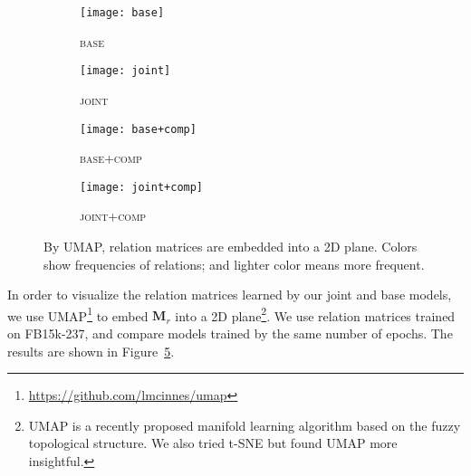 \documentclass[11pt,a4paper]{article}
\newcommand{\mat}[1]{\bm{#1}}
\begin{document}
\begin{figure}[!t]
\centering
\begin{subfigure}[b]{0.48\columnwidth}
\centering
\texttt{[image: base]}
\caption{\textsc{base}}
\label{subfig:umap-base}
\end{subfigure}
\begin{subfigure}[b]{0.48\columnwidth}
\centering
\texttt{[image: joint]}
\caption{\textsc{joint}}
\label{subfig:umap-joint}
\end{subfigure}
\begin{subfigure}[b]{0.48\columnwidth}
\centering
\texttt{[image: base+comp]}
\caption{\textsc{base+comp}}
\label{subfig:umap-base+comp}
\end{subfigure}
\begin{subfigure}[b]{0.48\columnwidth}
\centering
\texttt{[image: joint+comp]}
\caption{\textsc{joint+comp}}
\label{subfig:umap-joint+comp}
\end{subfigure}
\caption{%
By UMAP, relation matrices are embedded into a 2D plane. 
Colors show frequencies of relations; and lighter color means more frequent.}
\label{fig:umap}
\end{figure}

In order to visualize the relation matrices learned by our joint and base 
models, we use 
UMAP\footnote{\url{https://github.com/lmcinnes/umap}} 
\citep{2018arXivUMAP} to 
embed $\mat{M}_r$ into a 2D 
plane\footnote{UMAP is a recently proposed manifold 
learning algorithm based on the fuzzy topological structure. 
We also tried 
t-SNE \citep{maaten2008visualizing} but found UMAP more insightful.}. 
We use relation matrices trained on FB15k-237, and compare models trained by 
the same number of epochs. 
The results are shown in Figure~\ref{fig:umap}. 
\end{document}
